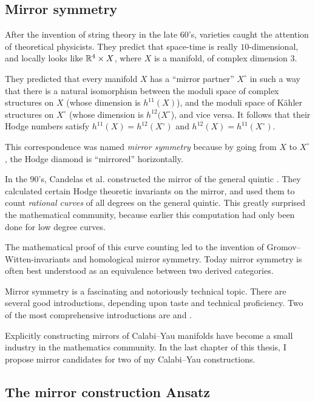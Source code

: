 \subsection{Mirror symmetry}

After the invention of string theory in the late 60's, \CY varieties caught the attention of theoretical physicists. They predict that space-time is really $10$-dimensional, and locally looks like $\mathbb{R}^4 \times X$, where $X$ is a \CY manifold, of complex dimension $3$.

They predicted that every \CY manifold $X$ has a ``mirror partner'' $X^\circ$ in such a way that there is a natural isomorphism between the moduli space of complex structures on $X$ (whose dimension is $h^{11}(X)$), and the moduli space of Kähler structures on $X^\circ$ (whose dimension is $h^{12}(X^\circ$), and vice versa. It follows that their Hodge numbers satisfy $h^{11}(X) = h^{12}(X^\circ)$ and $h^{12}(X)=h^{11}(X^\circ)$.

This correspondence was named \emph{mirror symmetry} because by going from $X$ to $X^\circ$, the Hodge diamond is ``mirrored'' horizontally.

In the 90's, Candelas et al. constructed the mirror of the general quintic \cite{candelas_string}. They calculated certain Hodge theoretic invariants on the mirror, and used them to count \emph{rational curves} of all degrees on the general quintic. This greatly surprised the mathematical community, because earlier this computation had only been done for low degree curves.

The mathematical proof of this curve counting led to the invention of Gromov--Witten-invariants and homological mirror symmetry. Today mirror symmetry is often best understood as an equivalence between two derived categories.

Mirror symmetry is a fascinating and notoriously technical topic. There are several good introductions, depending upon taste and technical proficiency. Two of the most comprehensive introductions are \cite{mirrorsymmetry} and \cite{mirrorsymmetry_vafa}.

Explicitly constructing mirrors of Calabi--Yau manifolds have become a small industry in the mathematics community. In the last chapter of this thesis, I propose mirror candidates for two of my Calabi--Yau constructions. 

\subsection{The mirror construction Ansatz}
\label{sec:the_mirror_construction_ansatz}

